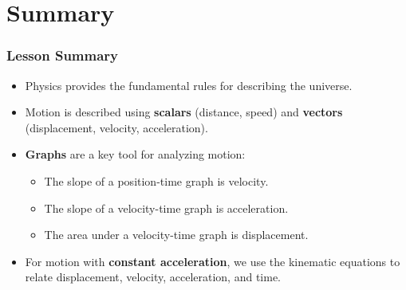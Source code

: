 \documentclass{beamer}
\begin{document}
\section{Summary}

\begin{frame}
\frametitle{Lesson Summary}
\begin{itemize}
    \item Physics provides the fundamental rules for describing the universe.
    \pause
    \item Motion is described using \textbf{scalars} (distance, speed) and \textbf{vectors} (displacement, velocity, acceleration).
    \pause
    \item \textbf{Graphs} are a key tool for analyzing motion:
    \pause
        \begin{itemize}
            \item The slope of a position-time graph is \alert{velocity}.
            \pause
            \item The slope of a velocity-time graph is \alert{acceleration}.
            \pause
            \item The area under a velocity-time graph is \alert{displacement}.
        \end{itemize}
    \pause
    \item For motion with \textbf{constant acceleration}, we use the kinematic equations to relate displacement, velocity, acceleration, and time.
\end{itemize}
\end{frame}
\end{document}
